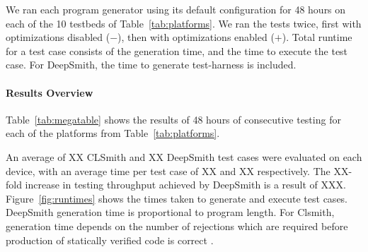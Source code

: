 We ran each program generator using its default configuration for 48 hours on each of the 10 testbeds of Table~\ref{tab:platforms}. We ran the tests twice, first with optimizations disabled ($-$), then with optimizations enabled ($+$). Total runtime for a test case consists of the generation time, and the time to execute the test case. For DeepSmith, the time to generate test-harness is included.


\paragraph{Results Overview}

\begin{table}
  \scriptsize %
  \centering %
  
  \caption{%
    Results from 48 hours of testing using CLSmith and DeepSmith. Testbed \#. as per Table~\ref{tab:platforms}. $\pm$ denotes optimizations off ($-$) vs on ($+$). The remaining columns denote the number of build crash (\textbf{bc}), build timeout (\textbf{bto}), build failure (\textbf{bf}), runtime crash (\textbf{c}), timeout (\textbf{to}), and pass (\textbf{\cmark}) results. %
  }
  \label{tab:megatable}
\end{table}

%  

Table~\ref{tab:megatable} shows the results of 48 hours of consecutive testing for each of the platforms from Table~\ref{tab:platforms}.

An average of XX CLSmith and XX DeepSmith test cases were evaluated on each device, with an average time per test case of XX and XX respectively. The XX-fold increase in testing throughput achieved by DeepSmith is a result of XXX. Figure~\ref{fig:runtimes} shows the times taken to generate and execute test cases. DeepSmith generation time is proportional to program length. For Clsmith, generation time depends on the number of rejections which are required before production of statically verified code is correct .


